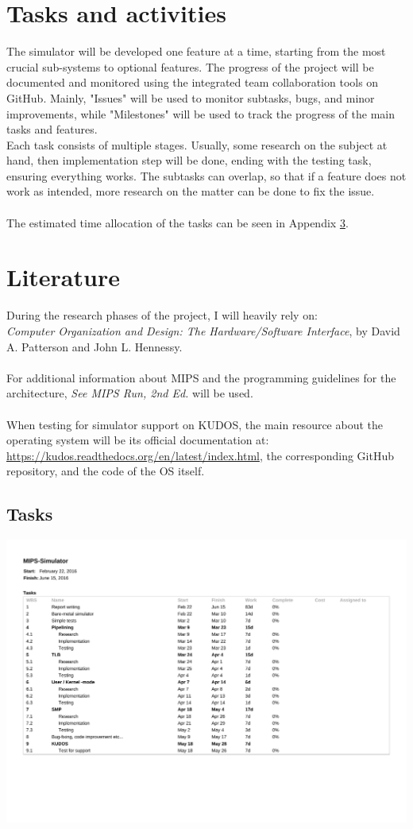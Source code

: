 \documentclass[11pt]{article}
\begin{document}
\section{Tasks and activities}
The simulator will be developed one feature at a time, starting from the
most crucial sub-systems to optional features. The progress of the project
will be documented and monitored  using the integrated team collaboration
tools on GitHub. Mainly, "Issues" will be used to monitor subtasks, bugs,
and minor improvements, while "Milestones" will be used to track the progress
of the main tasks and features.\\
Each task consists of multiple stages. Usually, some research
on the subject at hand, then implementation step will be done, ending with
the testing task, ensuring everything works. The subtasks can overlap, so
that if a feature does not work as intended, more research on the matter
can be done to fix the issue.\\\\
The estimated time allocation of the tasks can be seen in Appendix
\ref{appendix:Tasks}.


\section{Literature}
During the research phases of the project, I will heavily rely on:\\
 \textit{Computer Organization and Design: The Hardware/Software Interface},
 by David A. Patterson and John L. Hennessy.\\\\
For additional information about MIPS and the programming guidelines for
the architecture, \textit{See MIPS Run, 2nd Ed.} will be used.\\\\
When testing for simulator support on KUDOS, the main resource
about the operating system will be its official documentation at:
\url{https://kudos.readthedocs.org/en/latest/index.html}, the corresponding
GitHub repository, and the code of the OS itself.

\newpage
\appendix
\begin{appendices}
\section{Tasks}
\label{appendix:Tasks}
\includegraphics[scale=0.8,angle=270]{tasks.pdf}
%
\end{appendices}
\end{document}
